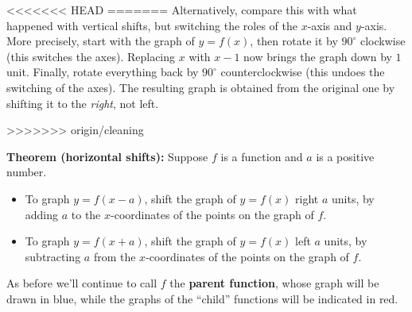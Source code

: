 \documentclass{ximera}
\begin{document}
<<<<<<< HEAD
=======
Alternatively, compare this with what happened with vertical shifts, but switching the roles of the $x$-axis and $y$-axis. More precisely, start with the graph of $y=f(x)$, then rotate it by $90^\circ$ clockwise (this switches the axes). Replacing $x$ with $x-1$ now brings the graph down by $1$ unit. Finally, rotate everything back by $90^\circ$ counterclockwise (this undoes the switching of the axes). The resulting graph is obtained from the original one by shifting it to the \emph{right}, not left. 

>>>>>>> origin/cleaning
\begin{callout}
  {\bf Theorem (horizontal shifts):} Suppose $f$ is a function and $a$ is a positive number.
  \begin{itemize}
  \item To graph $y = f(x-a)$, shift the graph of $y=f(x)$ right $a$ units, by adding $a$ to the $x$-coordinates of the points on the graph of $f$.
      \item To graph $y = f(x+a)$, shift the graph of $y=f(x)$ left $a$ units, by subtracting $a$ from the $x$-coordinates of the points on the graph of $f$.
  \end{itemize}
\end{callout}

As before we'll continue to call $f$ the {\bf parent function}, whose graph will be drawn in blue, while the graphs of the ``child'' functions will be indicated in red.
\end{document}
